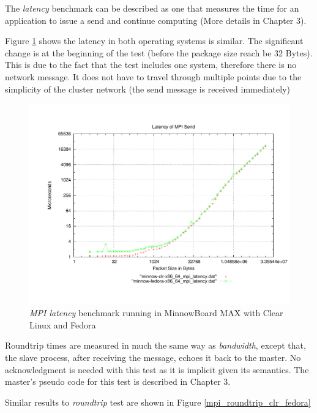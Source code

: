 The \textit{latency} benchmark can be described as one that measures the time
for an application to issue a send and continue computing (More details in
Chapter 3). 

Figure \ref{mpi_latency_clr_fedora} shows the latency in both operating systems
is similar. The significant change is at the beginning of the test (before the
package size reach be 32 Bytes). This is due to the fact that the test includes
one system, therefore there is no network message. It does not have
to travel through multiple points due to the simplicity of the cluster network
(the send message is received immediately) 

\begin{figure}
  \includegraphics[width=\paperwidth]{images/mpbench_clr_experiments/mpi_latency.pdf}
\caption{\textit{MPI latency} benchmark running in  MinnowBoard MAX with Clear Linux and
Fedora}
\label{mpi_latency_clr_fedora}
\end{figure}

Roundtrip times are measured in much the same way as \textit{bandwidth}, except
that, the slave process, after receiving the message, echoes it back to the
master. No acknowledgment is needed with this test as it is implicit given its
semantics. The master's pseudo code for this test is described in Chapter 3.

Similar results to \textit{roundtrip} test are shown in Figure \ref{mpi_roundtrip_clr_fedora}

